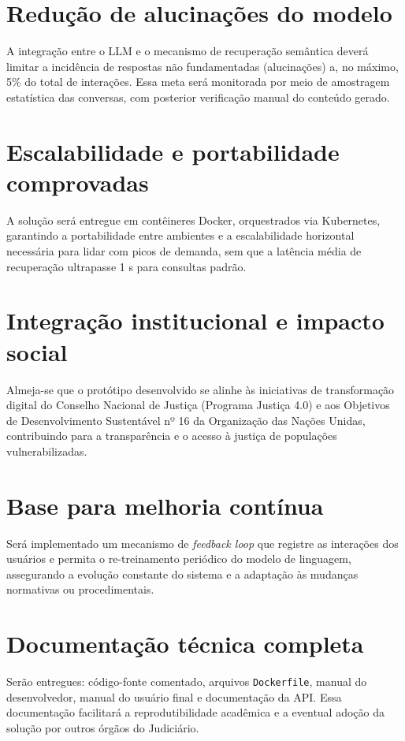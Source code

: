 \begin{description}
\section{Redução de alucinações do modelo}
A integração entre o LLM e o mecanismo de recuperação semântica deverá limitar a incidência de respostas não fundamentadas (alucinações) a, no máximo, 5\% do total de interações. Essa meta será monitorada por meio de amostragem estatística das conversas, com posterior verificação manual do conteúdo gerado.

\section{Escalabilidade e portabilidade comprovadas}
A solução será entregue em contêineres Docker, orquestrados via Kubernetes, garantindo a portabilidade entre ambientes e a escalabilidade horizontal necessária para lidar com picos de demanda, sem que a latência média de recuperação ultrapasse 1 s para consultas padrão.

\section{Integração institucional e impacto social}
Almeja-se que o protótipo desenvolvido se alinhe às iniciativas de transformação digital do Conselho Nacional de Justiça (Programa Justiça 4.0) e aos Objetivos de Desenvolvimento Sustentável nº 16 da Organização das Nações Unidas, contribuindo para a transparência e o acesso à justiça de populações vulnerabilizadas.

\section{Base para melhoria contínua}
Será implementado um mecanismo de \emph{feedback loop} que registre as interações dos usuários e permita o re-treinamento periódico do modelo de linguagem, assegurando a evolução constante do sistema e a adaptação às mudanças normativas ou procedimentais.

\section{Documentação técnica completa}
Serão entregues: código-fonte comentado, arquivos \texttt{Dockerfile}, manual do desenvolvedor, manual do usuário final e documentação da API. Essa documentação facilitará a reprodutibilidade acadêmica e a eventual adoção da solução por outros órgãos do Judiciário.


\end{description}
